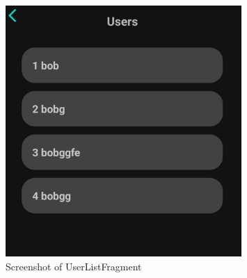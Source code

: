 \begin{figure}[H]
    \centering
    \includegraphics[width=0.8\textwidth]{images/userlistfragment-screenshot.jpeg}
    \caption{Screenshot of UserListFragment}
    \label{fig:userlistfragment_screenshot}
\end{figure}


